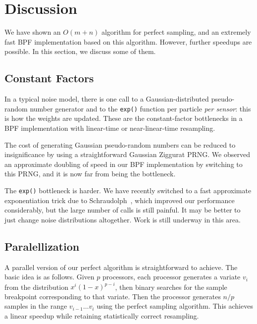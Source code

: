 \documentclass[12pt]{article}
\begin{document}
\section{Discussion}

  We have shown an $O(m + n)$ algorithm for perfect
  sampling, and an extremely fast BPF implementation based
  on this algorithm.  However, further speedups are
  possible.  In this section, we discuss some of them.

\subsection{Constant Factors}

  In a typical noise model, there is one call to a
  Gaussian-distributed pseudo-random number generator and to
  the {\tt exp()} function per particle {\em per sensor}:
  this is how the weights are updated.  These are the
  constant-factor bottlenecks in a BPF implementation with
  linear-time or near-linear-time resampling.

  The cost of generating Gaussian pseudo-random numbers can
  be reduced to insignificance by using a straightforward
  Gaussian Ziggurat PRNG.  We observed an approximate
  doubling of speed in our BPF implementation by switching
  to this PRNG, and it is now far from being the bottleneck.

  The {\tt exp()} bottleneck is harder.  We have recently
  switched to a fast approximate exponentiation trick due to
  Schraudolph~\cite{exp}, which improved our performance
  considerably, but the large number of calls is still
  painful.  It may be better to just change noise
  distributions altogether.  Work is still underway in this
  area.

\subsection{Paralellization}\label{sec-parallel}

  A parallel version of our perfect algorithm is
  straightforward to achieve. The basic idea is as follows.
  Given $p$ processors, each processor generates a variate
  $v_i$ from the distribution $x^i(1-x)^{p-i}$, then binary
  searches for the sample breakpoint corresponding to that
  variate.  Then the processor generates $n/p$ samples in
  the range $v_{i-1}\ldots v_i$ using the perfect sampling
  algorithm.  This achieves a linear speedup while retaining
  statistically correct resampling.
\end{document}
